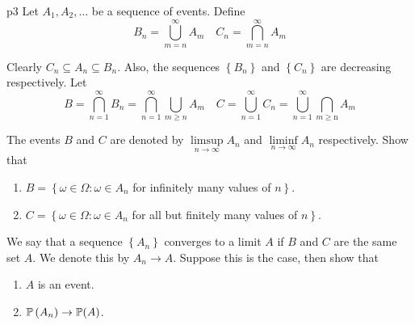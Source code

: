\documentclass[a4paper, 11pt]{article}
\begin{document}

\begin{problem}{%
	}{p3%
	}
Let $A_1, A_2, \ldots$ be a sequence of events. Define
$$
B_n=\bigcup_{m=n}^{\infty} A_m \quad C_n=\bigcap_{m=n}^{\infty} A_m
$$

Clearly $C_n \subseteq A_n \subseteq B_n$. Also, the sequences $\left\{B_n\right\}$ and $\left\{C_n\right\}$ are decreasing respectively. Let
$$
B=\bigcap_{n=1}^{\infty} B_n=\bigcap_{n=1}^{\infty} \bigcup_{m \geq n} A_m \quad C=\bigcup_{n=1}^{\infty} C_n=\bigcup_{n=1}^{\infty} \bigcap_{m \geq \mathrm{n}} A_m
$$

The events $B$ and $C$ are denoted by $\limsup\limits_{n \rightarrow \infty} A_n$ and $\liminf\limits_{n \rightarrow \infty} A_n$ respectively. Show that
\begin{enumerate}[label=(\alph*)]
	\item $B=\left\{\omega \in \Omega: \omega \in A_n\right.$ for infinitely many values of $\left.n\right\}$.
	\item $C=\left\{\omega \in \Omega: \omega \in A_n\right.$ for all but finitely many values of $\left.n\right\}$.
\end{enumerate}	
	We say that a sequence $\left\{A_n\right\}$ converges to a limit $A$ if $B$ and $C$ are the same set $A$. We denote this by $A_n \rightarrow A$. Suppose this is the case, then show that
	
	\begin{enumerate}[resume, label=(\alph*)]
		\item $A$ is an event.
	\item $\mathbb{P}\left(A_n\right) \rightarrow \mathbb{P}(A)$.
\end{enumerate} 

\end{problem}
\end{document}
